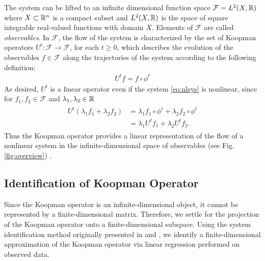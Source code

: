 The system can be lifted to an infinite dimensional function space $\mathcal{F} = L^2(X, \mathbb{R})$ where $X \subset \mathbb{R}^n$ is a compact subset and $L^2(X , \mathbb{R})$ is the space of square integrable real-valued functions with domain $X$.
Elements of $\mathcal{F}$ are called \emph{observables}.
In $\mathcal{F}$, the flow of the system is characterized by the set %
of Koopman operators 
$U^t : \mathcal{F} \to \mathcal{F}$, for each $t \geq 0$,
which describes the evolution of the observables ${f \in \mathcal{F}}$ along the trajectories of the system according to the following definition:
\begin{align}
    U^t f = f \circ \phi^t      
    \label{eq:koopman}
\end{align}
As desired, $U^t$ is a linear operator even if the system \eqref{eq:nlsys} is nonlinear, since for $f_1, f_2 \in \mathcal{F}$ and $\lambda_1, \lambda_2 \in \mathbb{R}$
\begin{align}
    \begin{split}
    U^t (\lambda_1 f_1 + \lambda_2 f_2) &= \lambda_1 f_1 \circ \phi^t + \lambda_2 f_2 \circ \phi^t \\
    &= \lambda_1 U^t f_1 + \lambda_2 U^t f_2.
    \end{split}
\end{align}
Thus the Koopman operator provides a linear representation of the flow of a nonlinear system in the infinite-dimensional space of observables (see Fig. \ref{fig:overview}) \cite{budivsic2012applied}.


\subsection{Identification of Koopman Operator}

Since the Koopman operator is an infinite-dimensional object, it cannot be represented by a finite-dimensional matrix. 
Therefore, we settle for the projection of the Koopman operator onto a finite-dimensional subspace.
Using the system identification method originally presented in \cite{mauroy2016linear} and \cite{mauroy2017koopman}, we identify a finite-dimensional approximation of the Koopman operator via linear regression performed on observed data.

